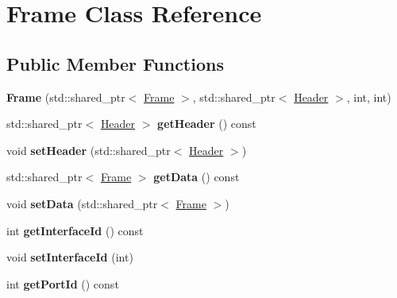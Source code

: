 \hypertarget{class_frame}{\section{Frame Class Reference}
\label{class_frame}
}
\subsection*{Public Member Functions}
\begin{DoxyCompactItemize}
\item 
\hypertarget{class_frame_ac01aff09bf1196d073d3271e7b266224}{{\bfseries Frame} (std\-::shared\-\_\-ptr$<$ \hyperlink{class_frame}{Frame} $>$, std\-::shared\-\_\-ptr$<$ \hyperlink{class_header}{Header} $>$, int, int)}\label{class_frame_ac01aff09bf1196d073d3271e7b266224}

\item 
\hypertarget{class_frame_ad7f060093f1fb7ce55319e88c1e9de1b}{std\-::shared\-\_\-ptr$<$ \hyperlink{class_header}{Header} $>$ {\bfseries get\-Header} () const }\label{class_frame_ad7f060093f1fb7ce55319e88c1e9de1b}

\item 
\hypertarget{class_frame_a036592c912612d67229df2a624bc8e61}{void {\bfseries set\-Header} (std\-::shared\-\_\-ptr$<$ \hyperlink{class_header}{Header} $>$)}\label{class_frame_a036592c912612d67229df2a624bc8e61}

\item 
\hypertarget{class_frame_a39899a7356b04bb774f2cb7fcaf747b9}{std\-::shared\-\_\-ptr$<$ \hyperlink{class_frame}{Frame} $>$ {\bfseries get\-Data} () const }\label{class_frame_a39899a7356b04bb774f2cb7fcaf747b9}

\item 
\hypertarget{class_frame_a39b6f739e420141d7578f3a0cbadcfad}{void {\bfseries set\-Data} (std\-::shared\-\_\-ptr$<$ \hyperlink{class_frame}{Frame} $>$)}\label{class_frame_a39b6f739e420141d7578f3a0cbadcfad}

\item 
\hypertarget{class_frame_a56bfc0242665e9ab20aef3e6a1393826}{int {\bfseries get\-Interface\-Id} () const }\label{class_frame_a56bfc0242665e9ab20aef3e6a1393826}

\item 
\hypertarget{class_frame_a380dd652a58b5d13efa6b530c78539f9}{void {\bfseries set\-Interface\-Id} (int)}\label{class_frame_a380dd652a58b5d13efa6b530c78539f9}

\item 
\hypertarget{class_frame_abf1b3a1718b0c985f5e502affc738d24}{int {\bfseries get\-Port\-Id} () const }\label{class_frame_abf1b3a1718b0c985f5e502affc738d24}


\end{DoxyCompactItemize}

